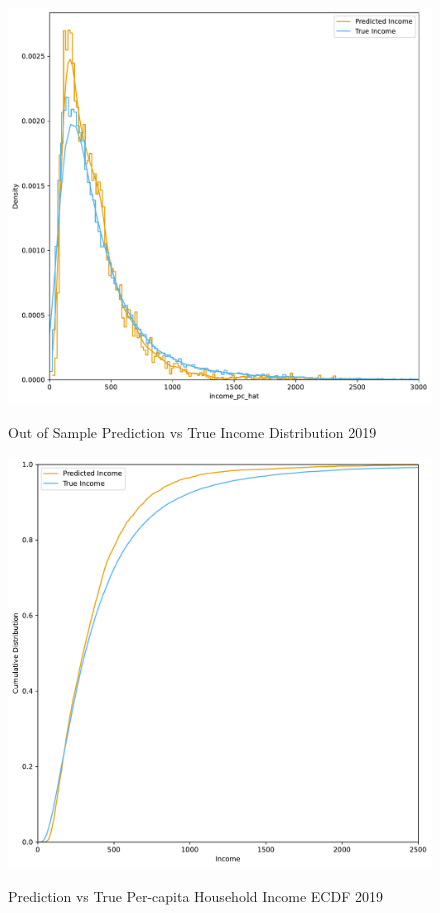 \begin{figure}[H]
    \centering
    \caption{Out of Sample Prediction vs True Income Distribution 2019}
    \includegraphics[width=1\textwidth]{../figures/fig1_prediction_vs_true_income_distribution_lasso_training_weighted.pdf}
    \label{fig:enter-label}
\end{figure}


\begin{figure}[H]
    \centering
    \caption{Prediction vs True Per-capita Household Income ECDF 2019}
    \includegraphics[width=1\textwidth]{../figures/fig1b_prediction_vs_true_income_ecdf_lasso_training_weighted.pdf}
    \label{fig:enter-label}
\end{figure}



